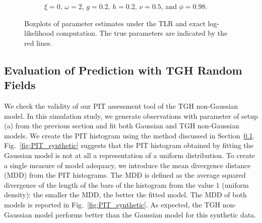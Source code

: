 \documentclass[conference]{IEEEtran}
\begin{document}
\begin{figure}[htp!]
\begin{subfigure}{0.45\textwidth}
  \caption{  $\xi = 0$, $\omega = 2$, $g = 0.2$, $h = 0.2$, $\nu = 0.5$, and $\phi = 0.98$.}
\end{subfigure}%
\caption{Boxplots of parameter estimates under the TLR and exact log-likelihood computation. The true parameters are indicated by the red lines.}
\label{fig:boxplot}
\end{figure}

\subsection{Evaluation of Prediction with TGH Random Fields}
\label{sec:pit}
We check the validity of our PIT assessment tool of the TGH non-Gaussian model. In this simulation study, we generate observations with parameter of setup (a) from the previous section and fit both Gaussian and TGH non-Gaussian models. We create the PIT histogram using the method discussed in Section~\ref{sec:pit}. Fig.~\ref{fig:PIT_synthetic} suggests that the PIT histogram obtained by fitting the Gaussian model is not at all a representation of a uniform distribution. To create a single measure of model adequacy, we introduce the mean divergence distance (MDD) from the PIT histograms. The MDD is defined as the average squared divergence of the length of the bars of the histogram from the value $1$ (uniform density): the smaller the MDD, the better the fitted model. The MDD of both models is reported in Fig.~\ref{fig:PIT_synthetic}. As expected, the TGH non-Gaussian model performs better than the Gaussian model for this synthetic data.
\end{document}
